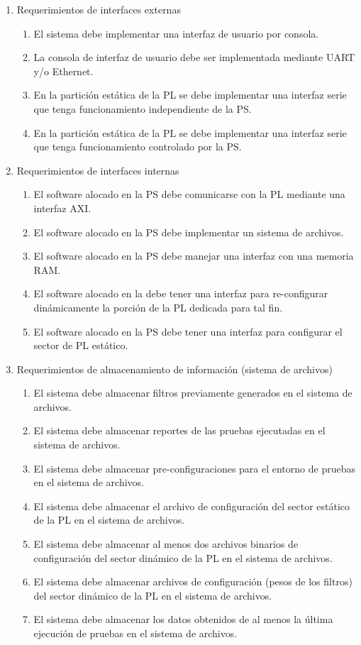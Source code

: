 \documentclass[
11pt, %
]{charter}
\begin{document}
\begin{enumerate}
	
	\item Requerimientos de interfaces externas
		\begin{enumerate}
			\item El sistema debe implementar una interfaz de usuario por consola.
			\item La consola de interfaz de usuario debe ser implementada mediante UART y/o Ethernet.
			\item En la partición estática de la PL se debe implementar una interfaz serie que tenga funcionamiento independiente de la PS.
			\item En la partición estática de la PL se debe implementar una interfaz serie que tenga funcionamiento controlado por la PS.
		\end{enumerate}
	
	\item Requerimientos de interfaces internas	
		\begin{enumerate}
			\item El software alocado en la PS debe comunicarse con la PL mediante una interfaz AXI.
			\item El software alocado en la PS debe implementar un sistema de archivos.
			\item El software alocado en la PS debe manejar una interfaz con una memoria RAM.
			\item El software alocado en la debe tener una interfaz para re-configurar dinámicamente la porción de la PL dedicada para tal fin.
			\item El software alocado en la PS debe tener una interfaz para configurar el sector de PL estático.
		\end{enumerate}
	
	\item Requerimientos de almacenamiento de información (sistema de archivos)
	\begin{enumerate}
		\item El sistema debe almacenar filtros previamente generados en el sistema de archivos.
		\item El sistema debe almacenar reportes de las pruebas ejecutadas en el sistema de archivos.
		\item El sistema debe almacenar pre-configuraciones para el entorno de pruebas en el sistema de archivos.
		\item El sistema debe almacenar el archivo de configuración del sector estático de la PL  en el sistema de archivos.
		\item El sistema debe almacenar al menos dos archivos binarios de configuración del sector dinámico de la PL  en el sistema de archivos.
		\item El sistema debe almacenar archivos de configuración (pesos de los filtros) del sector dinámico de la PL  en el sistema de archivos.
		\item El sistema debe almacenar los datos obtenidos de al menos la última ejecución de pruebas en el sistema de archivos.
	\end{enumerate}
	

\end{enumerate}
\end{document}
